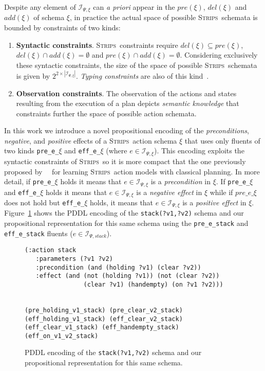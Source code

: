 \documentclass{article}
\newcommand{\strips}{\textsc{Strips}}
\begin{document}
Despite any element of ${\mathcal I}_{\Psi,\xi}$ can {\em a priori} appear in the $pre(\xi)$, $del(\xi)$ and $add(\xi)$ of schema $\xi$, in practice the actual space of possible \strips\ schemata is bounded by constraints of two kinds:
\begin{enumerate}
\item {\bf Syntactic constraints}. \strips\ constraints require $del(\xi)\subseteq pre(\xi)$, $del(\xi)\cap add(\xi)=\emptyset$ and $pre(\xi)\cap add(\xi)=\emptyset$. Considering exclusively these syntactic constraints, the size of the space of possible \strips\ schemata is given by $2^{2\times|{\mathcal I}_{\Psi,\xi}|}$. {\em Typing constraints} are also of this kind~\cite{mcdermott1998pddl}. 
\item {\bf Observation constraints}. The observation of the actions and states resulting from the execution of a plan depicts {\em semantic knowledge} that constraints further the space of possible action schemata.   
\end{enumerate}

In this work we introduce a novel propositional encoding of the {\em preconditions}, {\em negative}, and {\em positive} effects of a \strips\ action schema $\xi$ that uses only fluents of two kinds {\tt\small pre\_e\_$\xi$} and {\tt\small eff\_e\_$\xi$} (where $e\in{\mathcal I}_{\Psi,\xi}$). This encoding exploits the syntactic constraints of \strips\, so it is more compact that the one previously proposed by~\citeauthor{aineto2018learning}~\citeyear{aineto2018learning} for learning \strips\ action models with classical planning. In more detail, if {\tt\small pre\_e\_$\xi$} holds it means that $e\in{\mathcal I}_{\Psi,\xi}$ is a {\em precondition} in $\xi$. If {\tt\small pre\_e\_$\xi$} and {\tt\small eff\_e\_$\xi$} holds it means that $e\in{\mathcal I}_{\Psi,\xi}$ is a {\em negative effect} in $\xi$ while if $pre\_e\_\xi$ does not hold but {\tt\small eff\_e\_$\xi$} holds, it means that $e\in{\mathcal I}_{\Psi,\xi}$ is a {\em positive effect} in $\xi$. Figure~\ref{fig:propositional} shows the PDDL encoding of the {\tt\small stack(?v1,?v2)} schema and our propositional representation for this same schema using the {\tt\small pre\_e\_stack} and {\tt\small eff\_e\_stack} fluents ($e\in{\mathcal I}_{\Psi,stack}$).

\begin{figure}
  \begin{tiny}  
  \begin{verbatim}
(:action stack
   :parameters (?v1 ?v2)
   :precondition (and (holding ?v1) (clear ?v2))
   :effect (and (not (holding ?v1)) (not (clear ?v2))
                (clear ?v1) (handempty) (on ?v1 ?v2)))


(pre_holding_v1_stack) (pre_clear_v2_stack)
(eff_holding_v1_stack) (eff_clear_v2_stack)
(eff_clear_v1_stack) (eff_handempty_stack) (eff_on_v1_v2_stack)
  \end{verbatim}           
  \end{tiny}  
 \caption{\small PDDL encoding of the {\tt\small stack(?v1,?v2)} schema and our propositional representation for this same schema.}
\label{fig:propositional}
\end{figure}
\end{document}
